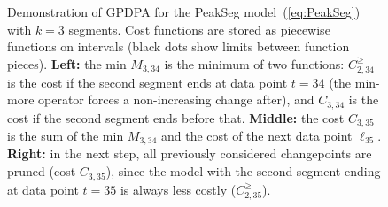 \documentclass[aoas]{imsart}
\begin{document}
\begin{figure}[t!]
  \centering
  
\vskip -1cm
  \caption{
    Demonstration of GPDPA for the PeakSeg model~(\ref{eq:PeakSeg})
    with $k=3$ segments. Cost functions are stored as piecewise
    functions on intervals (black dots show limits between function
    pieces). \textbf{Left:} the min \textcolor{Min}{$M_{3,34}$} is the
    minimum of two functions: \textcolor{MinMore}{$C^{\geq}_{2,34}$}
    is the cost if the second segment ends at data point $t=34$ (the
    min-more operator forces a non-increasing change after), and
    \textcolor{Ckt}{$C_{3,34}$} is the cost if the second segment ends
    before that. \textbf{Middle:} the cost \textcolor{Ckt}{$C_{3,35}$}
    is the sum of the min \textcolor{Min}{$M_{3,34}$} and the cost of
    the next data point \textcolor{Data}{$\ell_{35}$}. \textbf{Right:}
    in the next step, all previously considered changepoints are
    pruned (cost \textcolor{Ckt}{$C_{3,35}$}), since the model with the second
    segment ending at data point $t=35$ is always less costly
    (\textcolor{MinMore}{$C^{\geq}_{2,35}$}).  }
  \label{fig:min-envelope}
\end{figure}
\end{document}
